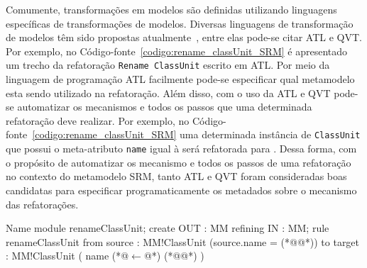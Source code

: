 Comumente, transformações em modelos são definidas utilizando linguagens específicas de transformações de modelos. Diversas linguagens de transformação de modelos têm sido propostas atualmente~\cite{Biehl_2010, Allilaire_06}, entre elas pode-se citar ATL e QVT. Por exemplo, no Código-fonte~\ref{codigo:rename_classUnit_SRM} é apresentado um trecho da refatoração \texttt{Rename ClassUnit} escrito em ATL. Por meio da linguagem de programação ATL facilmente pode-se especificar qual metamodelo esta sendo utilizado na refatoração. Além disso, com o uso da ATL e QVT pode-se automatizar os mecanismos e todos os passos que uma determinada refatoração deve realizar. Por exemplo, no Código-fonte~\ref{codigo:rename_classUnit_SRM} uma determinada instância de \texttt{ClassUnit} que possui o meta-atributo \texttt{name} igual à  será refatorada para . Dessa forma, com o propósito de automatizar os mecanismo e todos os passos de uma refatoração no contexto do metamodelo SRM, tanto ATL e QVT foram consideradas boas candidatas para especificar programaticamente os metadados sobre o mecanismo das refatorações. %


\begin{codigo}[caption={[Refatoração \textit{Rename ClassUnit}.] Refatoração \textit{Rename ClassUnit}.},escapeinside={(*@}{@*)}, basicstyle=\footnotesize, label={codigo:rename_classUnit_SRM}, language=ATL]{Name}
module renameClassUnit;
create OUT : MM refining IN : MM;
rule renameClassUnit {
	from
		source : MM!ClassUnit (source.name = (*@@*))
	to 
		target : MM!ClassUnit (
			name (*@$\leftarrow$@*) (*@@*)
		)
}
\end{codigo}




